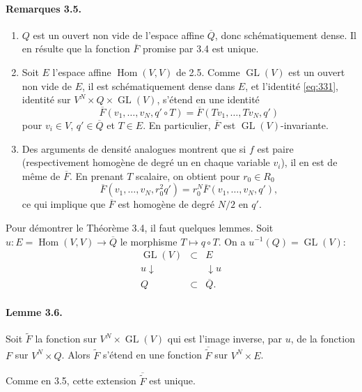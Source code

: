 \documentclass[11pt]{article}
\newcommand{\Hom}{\operatorname{Hom}}
\newcommand{\GL}{\operatorname{GL}}
\newcommand{\barQ}{\overline Q}
\begin{document}
\paragraph{Remarques 3.5.}
\begin{enumerate}[label=(\roman*)]
\item $Q$ est un ouvert non vide de l'espace affine $\barQ$, donc schématiquement dense. Il en résulte que la fonction $\overline F$ promise par 3.4 est unique.
\item Soit $E$ l'espace affine $\Hom(V,V)$ de 2.5. Comme $\GL(V)$ est un ouvert non vide de $E$, il est schématiquement dense dans $E$, et l'identité \eqref{eq:331}, identité sur $V^N\times Q\times\GL(V)$, s'étend en une identité
\begin{equation}
\label{eq:351}
\overline F(v_1,\ldots,v_N,q'\circ T)=\overline F(Tv_1,\ldots,Tv_N,q')
\end{equation}
pour $v_i\in V$, $q'\in\barQ$ et $T\in E$. En particulier, $\overline F$ est $\GL(V)$-invariante.
\item Des arguments de densité analogues montrent que si $f$ est paire (respectivement homogène de degré un en chaque variable $v_i$), il en est de même de $\overline F$. En prenant $T$ scalaire, on obtient pour $r_0\in R_0$
\[
\overline F(v_1,\ldots,v_N,r_0^2q')=r_0^N\overline F(v_1,\ldots,v_N,q'),
\]
ce qui implique que $\overline F$ est homogène de degré $N/2$ en $q'$.
\end{enumerate}

Pour démontrer le Théorème 3.4, il faut quelques lemmes. Soit $u:E=\Hom(V,V)\to\barQ$ le morphisme $T\mapsto q\circ T$. On a $u^{-1}(Q)=\GL(V)$:
\begin{equation}
\label{eq:352}
\begin{array}{ccc}
\GL(V)&\subset&E\\
\scriptstyle u\downarrow&&\downarrow\scriptstyle u\\
Q&\subset&\barQ.
\end{array}
\end{equation}

\paragraph{Lemme 3.6.}
Soit $\widetilde F$ la fonction sur $V^N\times\GL(V)$ qui est l'image inverse, par $u$, de la fonction $F$ sur $V^N\times Q$. Alors $\widetilde F$ s'étend en une fonction $\overline{\widetilde F}$ sur $V^N\times E$.

Comme en 3.5, cette extension $\overline{\widetilde F}$ est unique.
\end{document}
